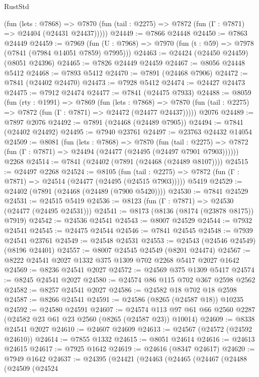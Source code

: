 \begin{lexlean}{RustStd}
\begin{coremodule}
{\begin{coremodule}
{{{{{{{{{{{{{{{{{{{{{{{{{{{{{{{{{{{{{{{{{{{{{{{{{{{{{{      (fun (lets : @7868) =>
      @7870 (fun (tail : @2275) => @7872 (fun (Γ : @7871) => @24404 (@24431 @24437)))))
@24449 := @7866 @24448
@24450 := @7863 @24449
@24459 := @7969
    (fun (U : @7968) => @7970 (fun (t : @59) => @7978 (@7841 (@7984 @14051 @7859) @7995)))
@24463 := @24424 (@24450 @24459) (@8051 @24396)
@24465 := @7826 @24449 @24459
@24467 := @8056 @24448 @5412
@24468 := @7893 @5412
@24470 := @7891 (@24468 @7906)
@24472 := @7841 (@24402 @24470)
@24473 := @7928 @5412
@24474 := @24427 @24473
@24475 := @7912 @24474
@24477 := @7841 (@24475 @7933)
@24488 := @8059
    (fun (rty : @1991) =>
    @7869
      (fun (lets : @7868) =>
      @7870 (fun (tail : @2275) => @7872 (fun (Γ : @7871) => @24472 (@24477 @24437)))))
    @2076
@24489 := @7897 @2076
@24492 := @7891 (@24468 (@24489 @7905))
@24494 := @7841 (@24402 @24492)
@24495 := @7940 @23761
@24497 := @23763 @24432 @14054
@24509 := @8081
    (fun (lets : @7868) =>
    @7870
      (fun (tail : @2275) =>
      @7872 (fun (Γ : @7871) => @24494 (@24477 (@24495 (@24497 @7901 @7903))))))
    @2268
@24514 := @7841 (@24402 (@7891 (@24468 (@24489 @8107))))
@24515 := @24497 @2268
@24524 := @8105
    (fun (tail : @2275) => @7872 (fun (Γ : @7871) => @24514 (@24477 (@24495 (@24515 @7903)))))
    @5419
@24529 := @24402 (@7891 (@24468 (@24489 (@7900 @5420))))
@24530 := @7841 @24529
@24531 := @24515 @5419
@24536 := @8123 (fun (Γ : @7871) => @24530 (@24477 (@24495 @24531)))
@24541 := @8173 (@8136 (@8174 (@23878 @8175)) @7919)
@24542 := @24536 @24541
@24543 := @8007 @24529
@24544 := @7932 @24541
@24545 := @24475 @24544
@24546 := @7841 @24545
@24548 := @7939 @24541 @23761
@24549 := @24548 @24531
@24553 := @24543 (@24546 @24549) (@8196 @24401)
@24557 := @8007 @24545 @24549 (@8201 @24474)
@24567 := @8222 @24541 @2027 @1332 @375 @1309 @702 @2268 @5417 @2027 @1642
@24569 := @8236 @24541 @2027
@24572 := @24569 @375 @1309 @5417
@24574 := @8245 @24541 @2027
@24580 := @24574 @86 @115 @702 @367 @2598 @2562
@24582 := @8257 @24541 @2027
@24586 := @24582 @18 @702 @18 @2598
@24587 := @8266 @24541
@24591 := @24586 (@8265 (@24587 @18)) @10235
@24592 := @24580 @24591
@24607 := @24574 @113 @97 @61 @66 @2560 @2287 (@24582 @23 @61 @23 @2560 (@8265 (@24587 @23)) @10014)
@24609 := @8338 @24541 @2027
@24610 := @24607 @24609
@24613 := @24567 (@24572 (@24592 @24610))
@24614 := @7855 @1332
@24615 := @8051 @24614
@24616 := @24613 @24615
@24617 := @7925 @1642
@24619 := @24616 (@8347 @24617)
@24620 := @7949 @1642
@24637 := @24395
    (@24421
      (@24463
        (@24465
          (@24467
            (@24488
              (@24509
                (@24524
}}}}}}}}}}}}}}}}}}}}}}}}}}}}}}}}}}}}}}}}}}}}}}}}}}}}}}
\end{coremodule}}
\end{coremodule}
\end{lexlean}
